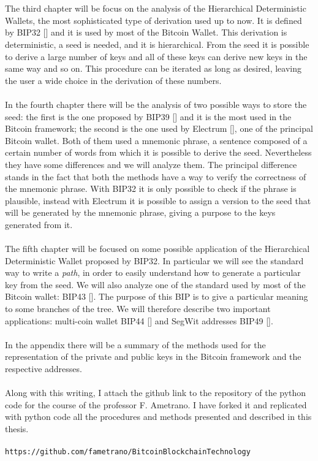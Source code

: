 \\ \\
The third chapter will be focus on the analysis of the Hierarchical Deterministic Wallets, the most sophisticated type of derivation used up to now. It is defined by BIP32 [\cite{1}] and it is used by most of the Bitcoin Wallet. This derivation is deterministic, a seed is needed, and it is hierarchical. From the seed it is possible to derive a large number of keys and all of these keys can derive new keys in the same way and so on. This procedure can be iterated as long as desired, leaving the user a wide choice in the derivation of these numbers.
\\ \\
In the fourth chapter there will be the analysis of two possible ways to store the seed: the first is the one proposed by BIP39 [\cite{2}] and it is the most used in the Bitcoin framework; the second is the one used by Electrum [\cite{3}], one of the principal Bitcoin wallet. Both of them used a mnemonic phrase, a sentence composed of a certain number of words from which it is possible to derive the seed. Nevertheless they have some differences and we will analyze them. The principal difference stands in the fact that both the methods have a way to verify the correctness of the mnemonic phrase. With BIP32 it is only possible to check if the phrase is plausible, instead with Electrum it is possible to assign a version to the seed that will be generated by the mnemonic phrase, giving a purpose to the keys generated from it.
\\ \\
The fifth chapter will be focused on some possible application of the Hierarchical Deterministic Wallet proposed by BIP32. In particular we will see the standard way to write a \textit{path}, in order to easily understand how to generate a particular key from the seed.  We will also analyze one of the standard used by most of the Bitcoin wallet: BIP43 [\cite{4}]. The purpose of this BIP is to give a particular meaning to some branches of the tree. We will therefore describe two important applications: multi-coin wallet BIP44 [\cite{5}] and SegWit addresses BIP49 [\cite{6}].
\\ \\
In the appendix there will be a summary of the methods used for the representation of the private and public keys in the Bitcoin framework and the respective addresses.
\\ \\
Along with this writing, I attach the github link to the repository of the python code for the course of the professor F. Ametrano. I have forked it and replicated with python code all the procedures and methods presented and described in this thesis.
\\ \\
\texttt{https://github.com/fametrano/BitcoinBlockchainTechnology}
